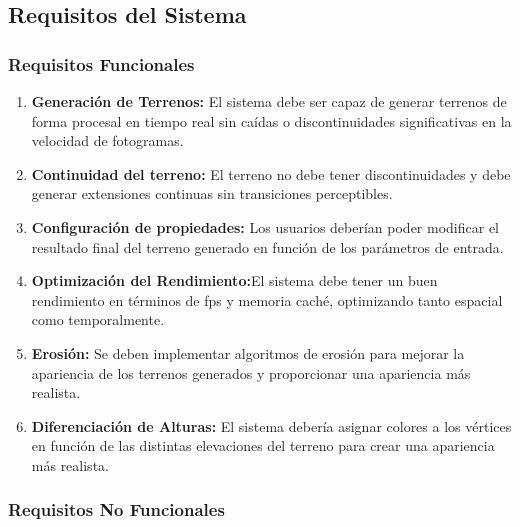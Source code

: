 \subsection{Requisitos del Sistema}

\subsubsection{Requisitos Funcionales}

\begin{enumerate}
    \item \textbf{Generación de Terrenos:} El sistema debe ser capaz de generar terrenos de forma procesal en tiempo real sin caídas o discontinuidades significativas en la velocidad de fotogramas.
    
    \item \textbf{Continuidad del terreno:} El terreno no debe tener discontinuidades y debe generar extensiones continuas sin transiciones perceptibles.
    
    \item \textbf{Configuración de propiedades:} Los usuarios deberían poder modificar el resultado final del terreno generado en función de los parámetros de entrada.
    
    \item \textbf{Optimización del Rendimiento:}El sistema debe tener un buen rendimiento en términos de fps y memoria caché, optimizando tanto espacial como temporalmente.
    
    \item \textbf{Erosión:} Se deben implementar algoritmos de erosión para mejorar la apariencia de los terrenos generados y proporcionar una apariencia más realista.
    
    \item \textbf{Diferenciación de Alturas:} El sistema debería asignar colores a los vértices en función de las distintas elevaciones del terreno para crear una apariencia más realista.
\end{enumerate}

\subsubsection{Requisitos No Funcionales}

